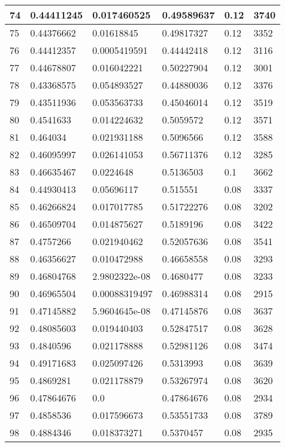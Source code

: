\begin{longtable}{|l|l|l|l|l|l|}
74 & 0.44411245 & 0.017460525 & 0.49589637 & 0.12 & 3740 \\ \hline 
75 & 0.44376662 & 0.01618845 & 0.49817327 & 0.12 & 3352 \\ \hline 
76 & 0.44412357 & 0.0005419591 & 0.44442418 & 0.12 & 3116 \\ \hline 
77 & 0.44678807 & 0.016042221 & 0.50227904 & 0.12 & 3001 \\ \hline 
78 & 0.43368575 & 0.054893527 & 0.44880036 & 0.12 & 3376 \\ \hline 
79 & 0.43511936 & 0.053563733 & 0.45046014 & 0.12 & 3519 \\ \hline 
80 & 0.4541633 & 0.014224632 & 0.5059572 & 0.12 & 3571 \\ \hline 
81 & 0.464034 & 0.021931188 & 0.5096566 & 0.12 & 3588 \\ \hline 
82 & 0.46095997 & 0.026141053 & 0.56711376 & 0.12 & 3285 \\ \hline 
83 & 0.46635467 & 0.0224648 & 0.5136503 & 0.1 & 3662 \\ \hline 
84 & 0.44930413 & 0.05696117 & 0.515551 & 0.08 & 3337 \\ \hline 
85 & 0.46266824 & 0.017017785 & 0.51722276 & 0.08 & 3202 \\ \hline 
86 & 0.46509704 & 0.014875627 & 0.5189196 & 0.08 & 3422 \\ \hline 
87 & 0.4757266 & 0.021940462 & 0.52057636 & 0.08 & 3541 \\ \hline 
88 & 0.46356627 & 0.010472988 & 0.46658558 & 0.08 & 3293 \\ \hline 
89 & 0.46804768 & 2.9802322e-08 & 0.4680477 & 0.08 & 3233 \\ \hline 
90 & 0.46965504 & 0.00088319497 & 0.46988314 & 0.08 & 2915 \\ \hline 
91 & 0.47145882 & 5.9604645e-08 & 0.47145876 & 0.08 & 3637 \\ \hline 
92 & 0.48085603 & 0.019440403 & 0.52847517 & 0.08 & 3628 \\ \hline 
93 & 0.4840596 & 0.021178888 & 0.52981126 & 0.08 & 3474 \\ \hline 
94 & 0.49171683 & 0.025097426 & 0.5313993 & 0.08 & 3639 \\ \hline 
95 & 0.4869281 & 0.021178879 & 0.53267974 & 0.08 & 3620 \\ \hline 
96 & 0.47864676 & 0.0 & 0.47864676 & 0.08 & 2934 \\ \hline 
97 & 0.4858536 & 0.017596673 & 0.53551733 & 0.08 & 3789 \\ \hline 
98 & 0.4884346 & 0.018373271 & 0.5370457 & 0.08 & 2935 \\ \hline 

\end{longtable}
